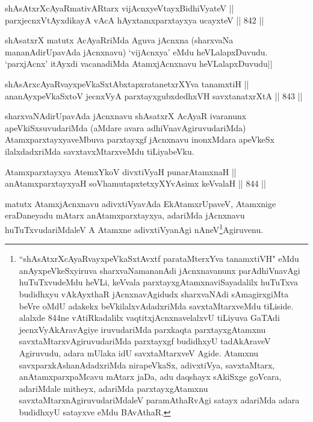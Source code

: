 
\begin{shl}
shAsAtxrXcAyaRmativAR\s tarx vijAcnxyeVtayxBidhiVyateV || \\
parxjecnxVtAyxdikayA vAcA hAyxtamxparxtayxya ucayxteV \hfill || 842 ||  
\end{shl}

\begin{artha}
shAsatxrX matutx AcAyaRriMda Aguva jAcnxna (sharxvaNa mananAdirUpavAda jAcnxnavu) `vijAcnxya' eMdu heVLalapxDuvudu. `parxjAcnx' itAyxdi vacanadiMda AtamxjAcnxnavu heVLalapxDuvudu||
\end{artha}


\begin{shl}
shAsArxcAyaRvayxpeVkaSxtAbxtapxratanetxrXYva tanamxtiH || \\
ananAyxpeVkaSxtoV jecnxVyA parxtayxgubxdedhxVH savxtanatxrXtA \hfill || 843 ||  
\end{shl}

\begin{artha}
sharxvaNAdirUpavAda jAcnxnavu shAsatxrX AcAyaR ivaranunx apeVkiSxsuvudariMda (aMdare avara adhiVnavAgiruvudariMda) Atamxparxtayxya\-veMbuva parxtayxgf jAcnxnavu inonxMdara apeVkeSx ilalxdadxriMda savxtavxMtarxveMdu tiLiyabeVku.
\end{artha}

\begin{shl}
Atamxparxtayxya AtemxYkoV divxtiVyaH punarAtamxnaH || \\
anAtamxparxtayxyaH soV\s hamutapxtetxyXYvAsimx keVvalaH \hfill || 844 ||  
\end{shl}

\begin{artha}
matutx AtamxjAcnxnavu adivxtiVyavAda EkAtamxrUpaveV, Atamxnige eraDaneyadu mAtarx anAtamxparxtayxya, adariMda jAcnxnavu huTuTxvudariMdaleV A Atamxne adivxtiVyanAgi nAneV\footnote{``shAsAtxrXcAyaRvayxpeVkaSxtAvxtf parataMterxYva tanamxtiVH" eMdu anAyxpeVkeSxyiruva sharxvaNamananAdi jAcnxnavanunx parAdhiVnavAgi huTuTxvudeMdu heVLi, keVvala parxtayxgAtamxnaviSayadalilx huTuTxva budidhxyu vAkAyxthaR jAcnxnavAgidudx sharxvaNAdi sAmagirxgiMta beVre oMdU adakekx beVkilalxvAdadxriMda savxtaMtarxveMdu tiLiside. alalxde 844ne vAtiRkadalilx vaqtitxjAcnxnavelalxvU tiLiyuva GaTAdi jecnxVyAkAravAgiye iruvudariMda parxkaqta parxtayxgAtamxnu savxtaMtarxvAgiruvudariMda parxtayxgf budidhxyU tadAkAraveV Agiruvudu, adara mUlaka idU savxtaMtarxveV Agide. Atamxnu savxparxkAshanAdadxriMda nirapeVkaSx, adivxtiVya, savxtaMtarx, anAtamxparxpaMcavu mAtarx jaDa, adu daqshayx sAkiSxge goVcara, adariMdale mitheyx, adariMda parxtayxgAtamxnu savxtaMtarxnAgiruvudariMdaleV paramAthaRvAgi satayx adariMda adara budidhxyU satayxve eMdu BAvAthaR.}Agiruvenu.
\end{artha}

